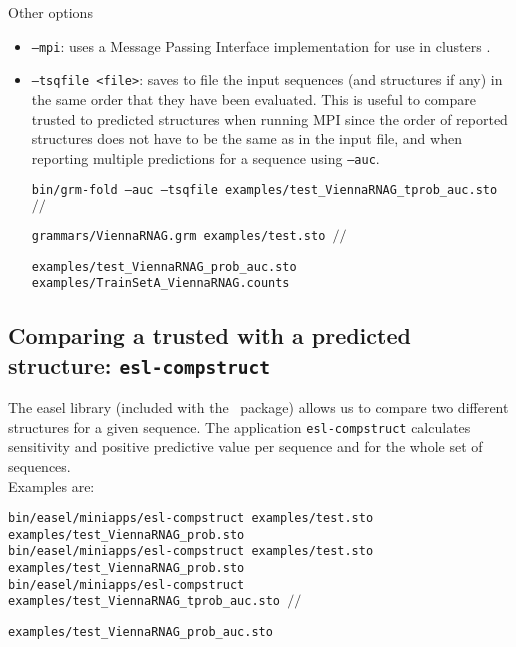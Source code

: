 \noindent
Other options
\begin{itemize}
\item \texttt{--mpi}: uses a Message Passing Interface
  implementation for use in clusters
.
\item \texttt{--tsqfile <file>}: saves to file the input sequences
  (and structures if any) in the same order that they have been
  evaluated. This is useful to compare trusted to predicted
  structures when running MPI since the order of reported structures
  does not have to be the same as in the input file, and when
  reporting multiple predictions for a sequence using \texttt{--auc}.\\

\begin{footnotesize}
\texttt{bin/grm-fold --auc --tsqfile examples/test\_ViennaRNAG\_tprob\_auc.sto $//$}

\hspace{15mm}\texttt{grammars/ViennaRNAG.grm examples/test.sto $//$}

\hspace{15mm}\texttt{examples/test\_ViennaRNAG\_prob\_auc.sto examples/TrainSetA\_ViennaRNAG.counts}\\
\end{footnotesize}

\end{itemize}

\subsection{Comparing a trusted with a predicted structure: \texttt{esl-compstruct}}
 The easel library (included with the \tornado\, package) allows us to compare
two different structures for a given sequence. The application \texttt{esl-compstruct}
calculates sensitivity and positive predictive value per sequence and for
the whole set of sequences.\\

Examples are:

\begin{footnotesize}
\texttt{bin/easel/miniapps/esl-compstruct examples/test.sto examples/test\_ViennaRNAG\_prob.sto}\\

\texttt{bin/easel/miniapps/esl-compstruct examples/test.sto examples/test\_ViennaRNAG\_prob.sto}\\

\texttt{bin/easel/miniapps/esl-compstruct examples/test\_ViennaRNAG\_tprob\_auc.sto $//$}

\hspace{15mm}\texttt{examples/test\_ViennaRNAG\_prob\_auc.sto}
\end{footnotesize}


